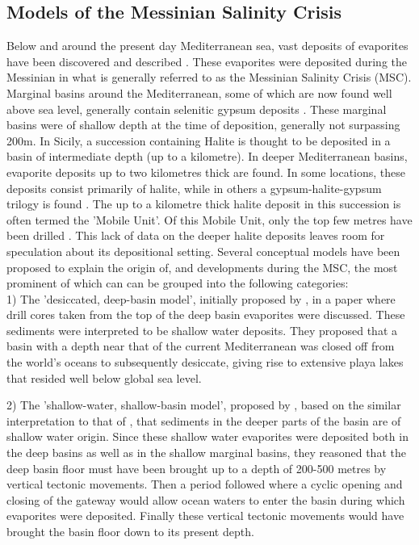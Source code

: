 \documentclass[twocolumn]{article}
\begin{document}
\subsection{Models of the Messinian Salinity Crisis}
Below and around the present day Mediterranean sea, vast deposits of evaporites have been discovered and described \citep{hsu1972origin, krijgsman1999chronology, rouchy2006messinian, roveri2014messinian, garcia2018geochemical}. These evaporites were deposited during the Messinian in what is generally referred to as the Messinian Salinity Crisis (MSC). Marginal basins around the Mediterranean, some of which are now found well above sea level, generally contain selenitic gypsum deposits \citep{garcia2018geochemical}. These marginal basins were of shallow depth at the time of deposition, generally not surpassing 200m. In Sicily, a succession containing Halite is thought to be deposited in a basin of intermediate depth (up to a kilometre). In deeper Mediterranean basins, evaporite deposits up to two kilometres thick are found. In some locations, these deposits consist primarily of halite, while in others a gypsum-halite-gypsum trilogy is found \citep{roveri2014messinian}. The up to a kilometre thick halite deposit in this succession is often termed the 'Mobile Unit'. Of this Mobile Unit, only the top few metres have been drilled \citep{hsu1972origin}. This lack of data on the deeper halite deposits leaves room for speculation about its depositional setting. Several conceptual models have been proposed to explain the origin of, and developments during the MSC, the most prominent of which can can be grouped into the following categories:\\

1) The 'desiccated, deep-basin model', initially proposed by \cite{hsu1972origin}, in a paper where drill cores taken from the top of the deep basin evaporites were discussed. These sediments were interpreted to be shallow water deposits. They proposed that a basin with a depth near that of the current Mediterranean was closed off from the world's oceans to subsequently desiccate, giving rise to extensive playa lakes that resided well below global sea level. 

2) The 'shallow-water, shallow-basin model', proposed by \cite{nesteroff1973mineralogy}, based on the similar interpretation to that of \cite{hsu1972origin}, that sediments in the deeper parts of the basin are of shallow water origin. Since these shallow water evaporites were deposited both in the deep basins as well as in the shallow marginal basins, they reasoned that the deep basin floor must have been brought up to a depth of 200-500 metres by vertical tectonic movements. Then a period followed where a cyclic opening and closing of the gateway would allow ocean waters to enter the basin during which evaporites were deposited. Finally these vertical tectonic movements would have brought the basin floor down to its present depth.
\end{document}
